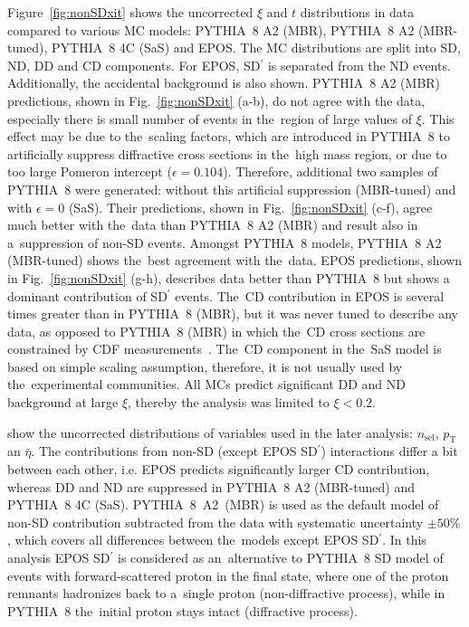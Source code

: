 Figure~\ref{fig:nonSDxit} shows the uncorrected $\xi$ and $t$ distributions in data compared to various \ac{MC} models: PYTHIA~8 A2 (MBR), PYTHIA~8 A2 (MBR-tuned), PYTHIA~8 4C (SaS) and EPOS. The \ac{MC} distributions are split into \ac{SD}, \ac{ND}, \ac{DD} and \ac{CD} components. For EPOS, SD$^\prime$ is separated from the ND events. Additionally, the accidental background is also shown. PYTHIA~8 A2 (MBR) predictions, shown in Fig.~\ref{fig:nonSDxit} (a-b), do not agree with the data, especially  there is small number of events in the~region of large values of $\xi$. 
This effect may be due to the~scaling factors, which are introduced in PYTHIA~8 to artificially suppress diffractive cross sections in the~high mass region, or due to too large Pomeron intercept ($\epsilon=0.104$).
 Therefore,
additional two samples of PYTHIA~8 were generated: without this artificial suppression  (\mbox{MBR-tuned}) and with  $\epsilon=0$ (\mbox{SaS}). Their predictions, shown in Fig.~\ref{fig:nonSDxit} (c-f), agree much better with the~data than PYTHIA~8 A2 (MBR) and result also in a~suppression of non-SD events. Amongst PYTHIA~8 models, PYTHIA~8 A2 (MBR-tuned) shows the~best agreement  with the~data.
EPOS predictions,  shown in Fig.~\ref{fig:nonSDxit} (g-h), describes data better than PYTHIA~8 but shows a dominant contribution of SD$^\prime$ events. The~CD contribution in EPOS is several times greater than in PYTHIA~8 (MBR), but it was never tuned to describe any data, as opposed to PYTHIA~8 (MBR) in which the~\ac{CD} cross sections are constrained by CDF measurements~\cite{Acosta:2003xi}. 
The~\ac{CD} component in the~\ac{SaS} model is based on simple scaling assumption, therefore, it is not usually used by the~experimental communities. All MCs predict significant \ac{DD} and \ac{ND} background at large $\xi$, thereby  the analysis was limited to $\xi < 0.2$. 


 show the uncorrected distributions of variables used in the later analysis: $n_{\mathrm{sel}}$, $p_{\mathrm T}$ an $\bar{\eta}$. The  contributions from non-SD (except  EPOS SD$^\prime$) interactions differ a bit between each other, i.e. EPOS predicts significantly larger CD contribution, whereas DD and ND are suppressed in PYTHIA~8 A2 (MBR-tuned) and PYTHIA~8 4C (SaS).  PYTHIA~8~A2~(MBR) is used as the default model  of non-SD contribution subtracted from the data with systematic uncertainty $\pm50\%$, which covers all differences between the~models except EPOS SD$^\prime$.  In this analysis EPOS SD$^\prime$ is   considered as an~alternative to PYTHIA~8 SD model of events with forward-scattered proton in the final state,  where one of the proton remnants hadronizes back to a~single proton (non-diffractive process), while in  PYTHIA~8 the~initial proton stays intact (diffractive process). %

